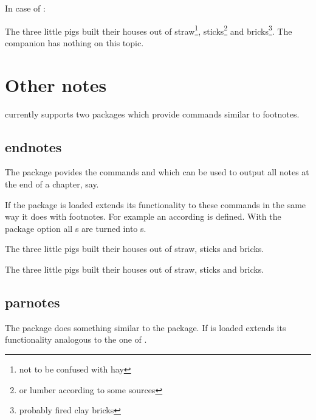 \documentclass[toc=index,toc=bib]{cnpkgdoc}
\begin{document}
In case of :
\begin{beispiel}
 \begin{minipage}{.5\linewidth}
  \noindent The three little pigs built their houses
  out of straw\footnote{not to be confused with hay},
  sticks\footnote{or lumber according to some sources}
  and bricks\footnote{probably fired clay bricks}. The
  companion has nothing on this topic\kfp.
 \end{minipage}
\end{beispiel}

\newpage
\section{Other notes}
\fnpct currently supports two packages which provide commands similar to footnotes.
\subsection{endnotes}
The  package povides the commands  and 
which can be used to output all notes at the end of a chapter, say.

If the package is loaded \fnpct extends its functionality to these commands in
the same way it does with footnotes. For example an according 
is defined. With the package option  all s are turned
into s.
\begin{beispiel}
 \begin{minipage}[t]{.4\linewidth}
  \noindent The three little pigs built their houses
  out of straw,
  sticks
  and bricks.
  
  \theendnotes
 \end{minipage}\hfil
 \begin{minipage}[t]{.4\linewidth}
  \noindent The three little pigs built their houses
  out of straw,
  sticks
  and bricks.
  
  \theendnotes
 \end{minipage}
\end{beispiel}

\newpage
\subsection{parnotes}
The  package does something similar to the 
package. If  is loaded \fnpct extends its functionality analogous
to the one of .
\end{document}
